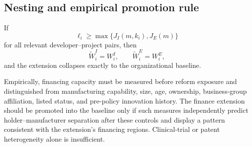 \subsection{Nesting and empirical promotion rule}

If
\begin{equation}
  \ell_i\geq\max\{J_I(m,k_i),J_E(m)\}
  \label{eq:ext-no-binding-finance}
\end{equation}
for all relevant developer--project pairs, then
\begin{equation}
  \widetilde W_i^I=W_i^I,
  \qquad
  \widetilde W_i^E=W_i^E,
  \label{eq:ext-finance-nesting}
\end{equation}
and the extension collapses exactly to the organizational baseline.

Empirically, financing capacity must be measured before reform exposure and
distinguished from manufacturing capability, size, age, ownership,
business-group affiliation, listed status, and pre-policy innovation history.
The finance extension should be promoted into the baseline only if such
measures independently predict holder--manufacturer separation after these
controls and display a pattern consistent with the extension's financing
regions. Clinical-trial or patent heterogeneity alone is insufficient.
